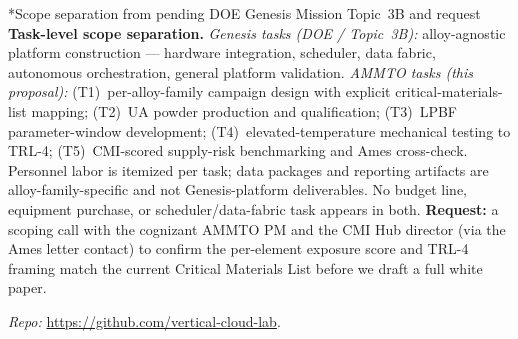\documentclass[10pt]{article}
\makeatletter
\renewcommand{\section}{\@startsection{section}{1}{0pt}{0.4ex plus 0.1ex}{0.15ex}{\normalfont\bfseries}}
\makeatother
\begin{document}
\section*{Scope separation from pending DOE Genesis Mission Topic~3B and request}
\textbf{Task-level scope separation.} \emph{Genesis tasks (DOE / Topic~3B):} alloy-agnostic platform construction --- hardware integration, scheduler, data fabric, autonomous orchestration, general platform validation. \emph{AMMTO tasks (this proposal):} (T1)~per-alloy-family campaign design with explicit critical-materials-list mapping; (T2)~UA powder production and qualification; (T3)~LPBF parameter-window development; (T4)~elevated-temperature mechanical testing to TRL-4; (T5)~CMI-scored supply-risk benchmarking and Ames cross-check. Personnel labor is itemized per task; data packages and reporting artifacts are alloy-family-specific and not Genesis-platform deliverables. No budget line, equipment purchase, or scheduler/data-fabric task appears in both. \textbf{Request:} a scoping call with the cognizant AMMTO PM and the CMI Hub director (via the Ames letter contact) to confirm the per-element exposure score and TRL-4 framing match the current Critical Materials List before we draft a full white paper.

{\footnotesize \emph{Repo:} \url{https://github.com/vertical-cloud-lab}.}
\end{document}
